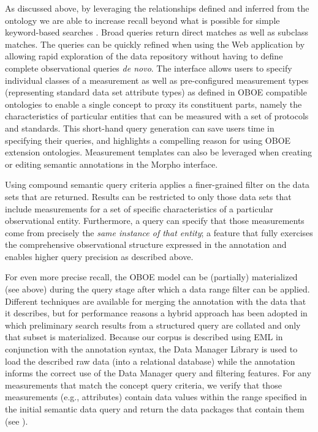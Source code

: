 As discussed above, by leveraging the relationships defined and
inferred from the ontology we are able to increase recall beyond what
is possible for simple keyword-based searches
\cite{berkley09:_improv_data_discov_for_metad}. Broad queries return
direct matches as well as subclass matches. The queries can be quickly
refined when using the Web application by allowing rapid exploration
of the data repository without having to define complete observational
queries \emph{de novo}. The interface allows users to specify
individual classes of a measurement as well as pre-configured
measurement types (representing standard data set attribute types) as
defined in OBOE compatible ontologies to enable a single concept to
proxy its constituent parts, namely the characteristics of particular
entities that can be measured with a set of protocols and
standards. This short-hand query generation can save users time in
specifying their queries, and highlights a compelling reason for using
OBOE extension ontologies. Measurement templates can also be leveraged when creating or
editing semantic annotations in the Morpho interface.

Using compound semantic query criteria applies a finer-grained filter
on the data sets that are returned. Results can be restricted to only
those data sets that include measurements for a set of specific
characteristics of a particular observational entity. Furthermore, a
query can specify that those measurements come from precisely the
\emph{same instance of that entity}; a feature that fully exercises
the comprehensive observational structure expressed in the annotation
and enables higher query precision as described above.

 For even more precise recall, the OBOE
model can be (partially) materialized (see above) during the query
stage after which a data range filter can be applied. Different
techniques are available for merging the annotation with the data that
it describes, but for performance reasons a hybrid approach has been
adopted in which preliminary search results from a structured query
are collated and only that subset is materialized. Because our corpus
is described using EML in conjunction with the annotation syntax, the
Data Manager Library \cite{leinfelder10:_metad_driven_approac_to_loadin} is used to load the described
raw data (into a relational database) while the annotation informs the
correct use of the Data Manager query and filtering features. For any
measurements that match the concept query criteria, we verify that
those measurements (e.g., attributes) contain data values within the
range specified in the initial semantic data query and return the data
packages that contain them (see ). 


